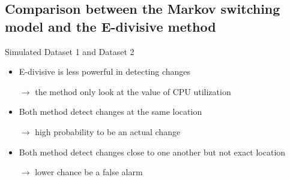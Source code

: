 \documentclass{beamer}
\begin{document}
\subsection{Comparison between the Markov switching model and the E-divisive method}
\begin{frame}[fragile]
Simulated Dataset 1 and Dataset 2

\begin{itemize}
	\item E-divisive is less powerful in detecting changes
	
	$\rightarrow$ the method only look at the value of CPU utilization
	
	\item Both method detect changes at the same location 
	
	$\rightarrow$ high probability to be an actual change
	
	\item Both method detect changes close to one another but not exact location 
	
	$\rightarrow$ lower chance be a false alarm
\end{itemize}

\end{frame}
\end{document}
